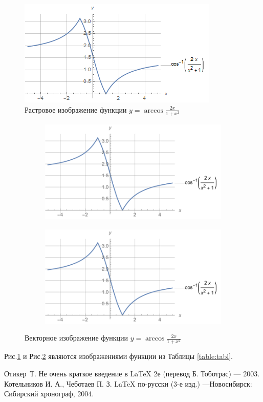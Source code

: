 \documentclass[a4paper,12pt]{article}
\begin{document}
\begin{figure}[h]
\includegraphics[width=\textwidth]{rastrr.png}
\caption{Растровое изображение функции $y=\arccos \frac{2x}{1+x^2}$}
\label{fig:pic1}
\end{figure}

\begin{figure}[h]
  \centering
  \begin{subfigure}[b]{0.45\linewidth}
    \includegraphics[width=\textwidth,height=5cm]{vect.pdf}
  \end{subfigure}
  \begin{subfigure}[b]{0.45\linewidth}
    \includegraphics[width=\textwidth,trim={ 0  1cm 5cm 0},clip]{vect.pdf}
  \end{subfigure}
  \caption{Векторное изображение функции $y=\arccos \frac{2x}{1+x^2}$}
   \label{fig:pic2}
\end{figure}

Рис.\ref{fig:pic1} и Рис.\ref{fig:pic2} являются изображениями функции из Таблицы \ref{table:tabl}.

\begin{thebibliography}{7}
 Отикер~Т. Не очень краткое введение в LaTeX 2е (перевод Б. Тоботрас) --- 2003.
 Котельников И. А., Чеботаев П. З. LaTeX по-русски (3-е изд.) ---Новосибирск: Сибирский хронограф, 2004.

\end{thebibliography}
\end{document}
